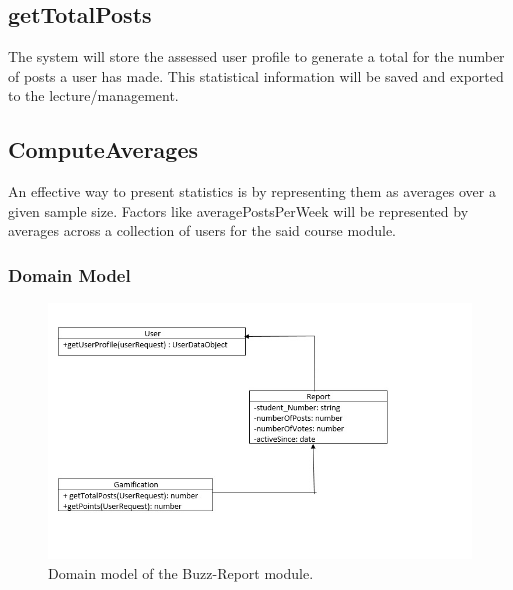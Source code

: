 \subsection*{getTotalPosts}
\par{The system will store the assessed user profile to generate a total for the number of posts a user has made. This statistical information will be saved and exported to the lecture/management.}
\subsection*{ComputeAverages}
\par{An effective way to present statistics is by representing them as averages over a given sample size. Factors like averagePostsPerWeek will be represented by averages across a collection of users for the said course module.}

\subsubsection{Domain Model}
\begin{figure}[h]
\includegraphics[width=\linewidth]
{Diagrams/report_domain_model.jpeg}
\caption {Domain model of the Buzz-Report module.}
\end{figure}
